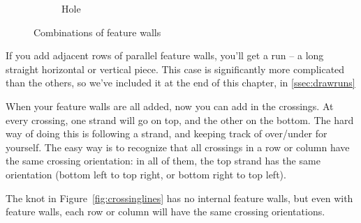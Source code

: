 \documentclass[openany]{book}
\begin{document}
\begin{figure}[H]
\begin{subfigure}[t]{.3\textwidth}

		\caption{Hole}
	\end{subfigure}

\caption{Combinations of feature walls}
\end{figure}


If you add adjacent rows of parallel feature walls, you'll get a run -- a long straight horizontal or vertical piece. This case is significantly more complicated than the others, so we've included it at the end of this chapter, in \ref{ssec:drawruns}



When your feature walls are all added, now you can add in the crossings. At every crossing, one strand will go on top, and the other on the bottom. The hard way of doing this is following a strand, and keeping track of over/under for yourself. The easy way is to recognize that all crossings in a row or column have the same crossing orientation: in all of them, the top strand has the same orientation (bottom left to top right, or bottom right to top left). 

The knot in Figure~\ref{fig:crossinglines} has no internal feature walls, but even with feature walls, each row or column will have the same crossing orientations.
\end{document}
